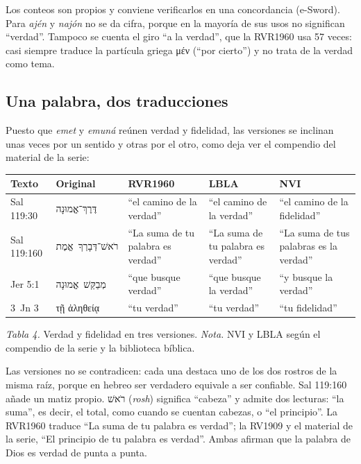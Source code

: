 \documentclass[11pt,letterpaper]{article}
\newcommand{\heb}[1]{\mbox{\foreignlanguage{hebrew}{#1}}}
\newcommand{\grc}[1]{\foreignlanguage{ancientgreek}{#1}}
\begin{document}
\begin{nota}[Precisión]
Los conteos son propios y conviene verificarlos en una concordancia (e-Sword). Para \emph{ajén} y \emph{najón} no se da cifra, porque en la mayoría de sus usos no significan ``verdad''. Tampoco se cuenta el giro ``a la verdad'', que la RVR1960 usa 57 veces: casi siempre traduce la partícula griega \grc{μέν} (``por cierto'') y no trata de la verdad como tema.
\end{nota}

\subsection{Una palabra, dos traducciones}
Puesto que \emph{emet} y \emph{emuná} reúnen verdad y fidelidad, las versiones se inclinan unas veces por un sentido y otras por el otro, como deja ver el compendio del material de la serie:

\begin{center}\small\renewcommand{\arraystretch}{1.2}
\begin{tabular}{@{}L{1.8cm}L{2.4cm}L{3.3cm}L{3.2cm}L{3.4cm}@{}}
\toprule
\textbf{Texto} & \textbf{Original} & \textbf{RVR1960} & \textbf{LBLA} & \textbf{NVI} \\ \midrule
Sal 119:30 & \heb{דֶּרֶךְ־אֱמוּנָה} & ``el camino de la verdad'' & ``el camino de la verdad'' & ``el camino de la fidelidad'' \\
Sal 119:160 & \heb{רֹאשׁ־דְּבָרְךָ אֱמֶת} & ``La suma de tu palabra es verdad'' & ``La suma de tu palabra es verdad'' & ``La suma de tus palabras es la verdad'' \\
Jer 5:1 & \heb{מְבַקֵּשׁ אֱמוּנָה} & ``que busque verdad'' & ``que busque la verdad'' & ``y busque la verdad'' \\
3~Jn 3 & \grc{τῇ ἀληθείᾳ} & ``tu verdad'' & ``tu verdad'' & ``tu fidelidad'' \\
\bottomrule
\end{tabular}\par
{\footnotesize\color{gris}\textit{Tabla 4.} Verdad y fidelidad en tres versiones. \textit{Nota.} NVI y LBLA según el compendio de la serie y la biblioteca bíblica.}
\end{center}

Las versiones no se contradicen: cada una destaca uno de los dos rostros de la misma raíz, porque en hebreo ser verdadero equivale a ser confiable. Sal 119:160 añade un matiz propio. \heb{רֹאשׁ} (\emph{rosh}) significa ``cabeza'' y admite dos lecturas: ``la suma'', es decir, el total, como cuando se cuentan cabezas, o ``el principio''. La RVR1960 traduce ``La suma de tu palabra es verdad''; la RV1909 y el material de la serie, ``El principio de tu palabra es verdad''. Ambas afirman que la palabra de Dios es verdad de punta a punta.
\end{document}
